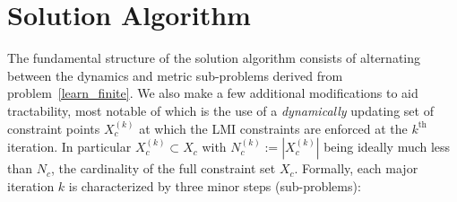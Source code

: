 \documentclass[conference]{svproc}
\begin{document}
\vspace{-2mm}
\section{Solution Algorithm} \label{sec:soln}
\vspace{-2mm}
The fundamental structure of the solution algorithm consists of alternating between the dynamics and metric sub-problems derived from problem~\eqref{learn_finite}. We also make a few additional modifications to aid tractability, most notable of which is the use of a \emph{dynamically} updating set of constraint points $X_c^{(k)}$ at which the LMI constraints are enforced at the $k^{\text{th}}$ iteration. In particular $X_c^{(k)} \subset X_c$ with $N_c^{(k)}:= |X_c^{(k)}|$ being ideally much less than $N_c$, the cardinality of the full constraint set $X_c$. Formally, each major iteration $k$ is characterized by three minor steps (sub-problems):
\end{document}

